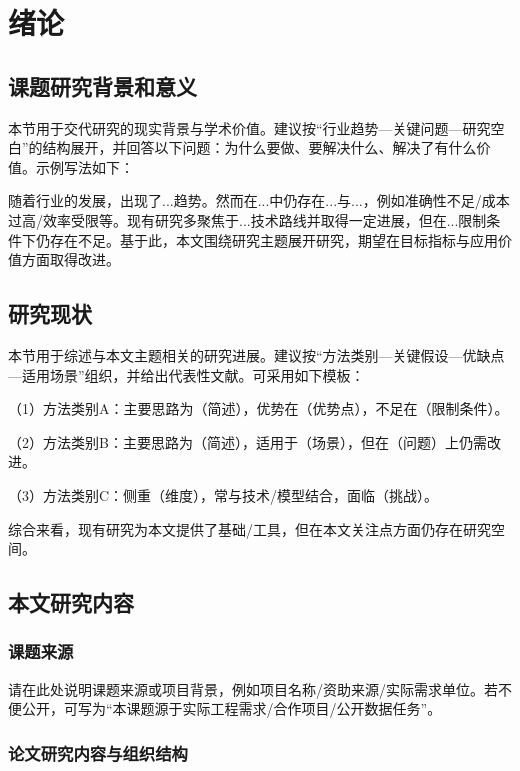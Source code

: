 \documentclass[unicode,master,submission,final]{scutthesis}
\begin{document}
\chapter{绪论}

\section{课题研究背景和意义}

本节用于交代研究的现实背景与学术价值。建议按“行业趋势—关键问题—研究空白”的结构展开，并回答以下问题：为什么要做、要解决什么、解决了有什么价值。示例写法如下：

随着行业的发展，出现了...趋势。然而在...中仍存在...与...，例如准确性不足/成本过高/效率受限等。现有研究多聚焦于...技术路线并取得一定进展，但在...限制条件下仍存在不足。基于此，本文围绕研究主题展开研究，期望在目标指标与应用价值方面取得改进。

\section{研究现状}

本节用于综述与本文主题相关的研究进展。建议按“方法类别—关键假设—优缺点—适用场景”组织，并给出代表性文献\cite{sample1,sample2,sample3}。可采用如下模板：

（1）方法类别A：主要思路为（简述），优势在（优势点），不足在（限制条件）。

（2）方法类别B：主要思路为（简述），适用于（场景），但在（问题）上仍需改进。

（3）方法类别C：侧重（维度），常与技术/模型结合，面临（挑战）。

综合来看，现有研究为本文提供了基础/工具，但在本文关注点方面仍存在研究空间。

\section{本文研究内容}

\subsection{课题来源}

请在此处说明课题来源或项目背景，例如项目名称/资助来源/实际需求单位。若不便公开，可写为“本课题源于实际工程需求/合作项目/公开数据任务”。

\subsection{论文研究内容与组织结构}
\end{document}
